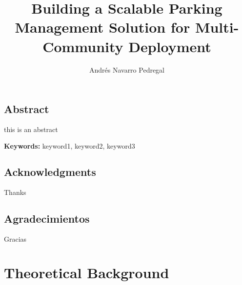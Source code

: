 \documentclass[oneside, 12pt, a4paper]{book}
\title{Building a Scalable Parking Management Solution for Multi-Community Deployment}
\author{Andrés Navarro Pedregal}
\begin{document}

\frontmatter
\maketitle

\blankpage%
\chapter*{Abstract}

this is an abstract

\textbf{Keywords:} keyword1, keyword2, keyword3

\blankpage%

\chapter*{Acknowledgments}
\begingroup
\let\clearpage\relax %

Thanks

\chapter*{Agradecimientos}

Gracias

\endgroup

\blankpage%

\renewcommand{\contentsname}{Table of Contents}
\tableofcontents

\blankpage%

\listoffigures

\blankpage%

\listoftables

\blankpage%

\printglossary[type=\acronymtype,style=long, title=LIST OF ACROYNMS]

\blankpage%

\mainmatter%








\part{Theoretical Background}
\end{document}

